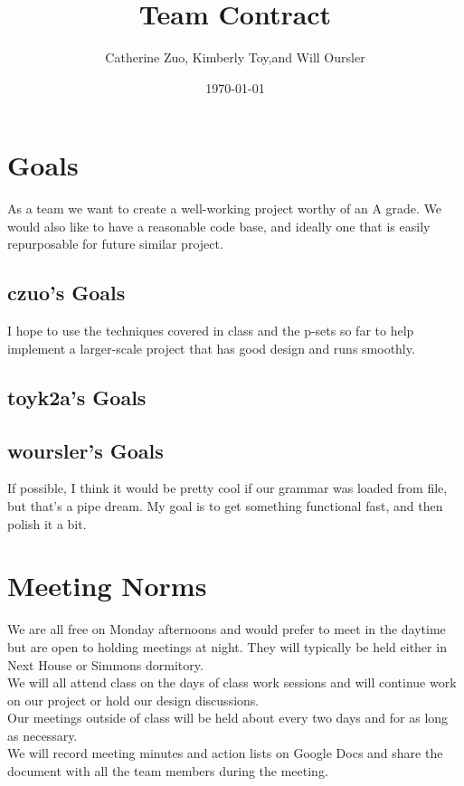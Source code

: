 

\author{ Catherine Zuo, Kimberly Toy,and Will Oursler} 
\address{ MIT, Cambridge, MA }
\title{Team Contract}
\date{\today}
\maketitle

\section{ Goals }
As a team we want to create a well-working project worthy of an A grade. We would also like to have a reasonable code base, and ideally one that is easily repurposable for future similar project.

\subsection{ czuo's Goals }
I hope to use the techniques covered in class and the p-sets so far to help implement a larger-scale project that has good design and runs smoothly.  
\subsection{ toyk2a's Goals }
\subsection{ woursler's Goals }
If possible, I think it would be pretty cool if our grammar was loaded from file, but that's a pipe dream. My goal is to get something functional fast, and then polish it a bit.

\section{Meeting Norms}
We are all free on Monday afternoons and would prefer to meet in the daytime but are open to holding meetings at night.  They will typically be held either in Next House or Simmons dormitory.  
\newline
\\We will all attend class on the days of class work sessions and will continue work on our project or hold our design discussions.  
\newline
\\Our meetings outside of class will be held about every two days and for as long as necessary.  
\newline
\\We will record meeting minutes and action lists on Google Docs and share the document with all the team members during the meeting.  

